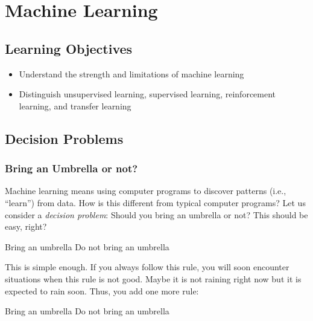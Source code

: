 \chapter{Machine Learning}



\section{Learning Objectives}


\begin{itemize}
\item Understand the strength and limitations of machine learning
\item Distinguish  unsupervised learning,  supervised learning,  reinforcement learning, and transfer
  learning
\end{itemize}

\section{Decision Problems}



\subsection{Bring an Umbrella or not?}

Machine learning means using computer programs to discover patterns
(i.e., ``learn'') from data. How is this different from typical
computer programs?  Let us consider a {\it decision problem}:
Should you bring an umbrella or not?  This should be easy, right?

\begin{algorithm}
    \begin{algorithmic}[1]
      \State Bring an umbrella
      \Else
      \State Do not bring an umbrella
      \EndIf
    \end{algorithmic}
\end{algorithm}

This is simple enough.  If you always follow this rule, you will soon
encounter situations when this rule is not good.  Maybe it is not raining
right now but it is expected to rain soon. Thus, you add one more rule:

\begin{algorithm}
    \begin{algorithmic}[1]
      \State Bring an umbrella
      \Else
      \State Do not bring an umbrella
      \EndIf
    \end{algorithmic}
\end{algorithm}

